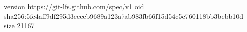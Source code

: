 version https://git-lfs.github.com/spec/v1
oid sha256:5fc4aff9df295d3eeccb9689a123a7ab983fb66f15d54c5c760118bb3bebb10d
size 21167
